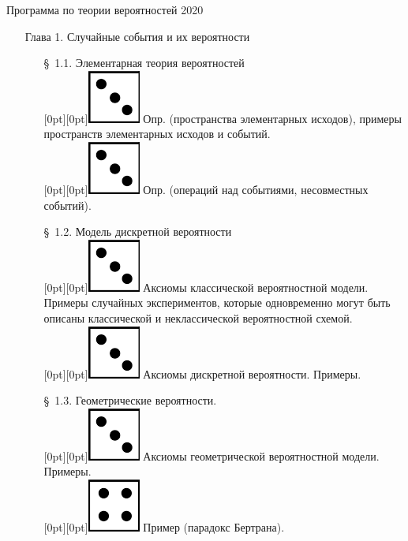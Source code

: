 \documentclass[10pt]{amsart}
\begin{document}
\thispagestyle{empty}

\begin{center}
    {\Large Программа по теории вероятностей 2020}
\end{center}


\begin{enumerate}
\item[Глава 1.] Случайные события и их вероятности \\
\begin{enumerate}
\item[\S\, 1.1.] Элементарная теория вероятностей \\
 \raisebox{-1pt}[0pt][0pt]{\includegraphics[width=0.02\linewidth]{3.png}} Опр. (пространства элементарных исходов), примеры пространств элементарных исходов и событий. \\
 \raisebox{-1pt}[0pt][0pt]{\includegraphics[width=0.02\linewidth]{3.png}} Опр. (операций над событиями, несовместных событий). \\
\item[\S\, 1.2.] Модель дискретной вероятности \\
 \raisebox{-1pt}[0pt][0pt]{\includegraphics[width=0.02\linewidth]{3.png}} Аксиомы классической вероятностной модели. Примеры случайных экспериментов, которые одновременно могут быть описаны классической и неклассической вероятностной схемой. \\
 \raisebox{-1pt}[0pt][0pt]{\includegraphics[width=0.02\linewidth]{3.png}} Аксиомы дискретной вероятности. Примеры. \\
\item[\S\, 1.3.] Геометрические вероятности. \\
 \raisebox{-1pt}[0pt][0pt]{\includegraphics[width=0.02\linewidth]{3.png}} Аксиомы геометрической вероятностной модели. Примеры. \\
 \raisebox{-1pt}[0pt][0pt]{\includegraphics[width=0.02\linewidth]{4.png}} Пример (парадокс Бертрана). \\ 


\end{enumerate}
\end{enumerate}
\end{document}
